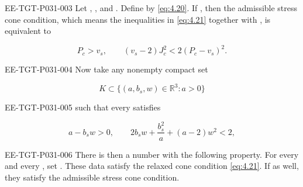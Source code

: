 \begin{lemma}\label{lem:4.5}
\begin{EESegment}{EE-TGT-P031-003}
Let , , and
. Define
 by \eqref{eq:4.20}. If
, then the admissible stress cone condition, which
means the inequalities in \eqref{eq:4.21} together with
, is equivalent to
\end{EESegment}
\begin{equation}
  P_c>v_s,\qquad (v_s-2)J_c^2<2(P_c-v_s)^2.
  \tag{4.22}\label{eq:4.22}
\end{equation}

\begin{EESegment}{EE-TGT-P031-004}
Now take any nonempty compact set
\end{EESegment}
\[
  K\subset\{(a,b_s,w)\in\mathbb{R}^3:a>0\}
\]
\begin{EESegment}{EE-TGT-P031-005}
such that every  satisfies
\end{EESegment}
\[
  a-b_sw>0,\qquad 2b_sw+\frac{b_s^2}{a}+(a-2)w^2<2,
\]
\begin{EESegment}{EE-TGT-P031-006}
There is then a number  with the following
property. For every  and every
, set
. These data satisfy the relaxed cone
condition \eqref{eq:4.21}. If  as well, they
satisfy the admissible stress cone condition.
\end{EESegment}
\end{lemma}


